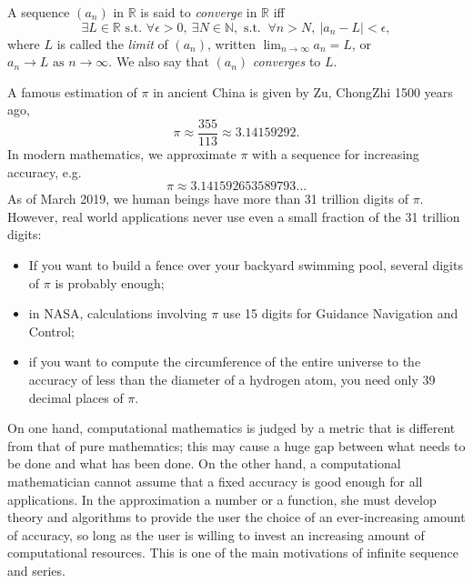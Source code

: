 \begin{defn}
  \label{def:limitOfSequence}
  A sequence $(a_n)$ in $\mathbb{R}$
  is said to \emph{converge} in $\mathbb{R}$ iff
  \begin{equation}
    \label{eq:limitOfSequence}
    \exists L\in \mathbb{R} \text{ s.t. }  
    \forall \epsilon>0,\ \exists N\in \mathbb{N}, \text{ s.t. }\ 
    \forall n>N, \ |a_n-L| < \epsilon, 
  \end{equation}
  where $L$ is called the \emph{limit} of $(a_n)$, 
  written $\lim_{n\rightarrow \infty} a_n = L$,
  or 
  \mbox{$a_n\rightarrow L \text{ as } n\rightarrow\infty$}.
  We also say that $(a_n)$ \emph{converges} to $L$.
\end{defn}

\begin{exm}[A story of $\pi$]
  A famous estimation of $\pi$ in ancient China
  is given by Zu, ChongZhi 1500 years ago,
  \begin{equation*}
    \pi\approx \frac{355}{113}\approx 3.14159292.
  \end{equation*}
  In modern mathematics,
   we approximate $\pi$ with a sequence
   for increasing accuracy, e.g. 
   \begin{equation}
     \label{eq:pi}
     \pi \approx 3.14159 26535 89793 \ldots
   \end{equation}
  As of March 2019, we human beings have more than 31 trillion digits
  of $\pi$.
  However, real world applications
  never use even a small fraction of the 31 trillion digits:
  \begin{itemize}\itemsep0em
  \item If you want to build a fence over your backyard swimming pool,
    several digits of $\pi$ is probably enough;
  \item in NASA, calculations involving $\pi$
    use 15 digits for Guidance Navigation and Control;
  \item if you want to compute the circumference of the entire universe
    to the accuracy of less than the diameter of a hydrogen atom,
    you need only 39 decimal places of $\pi$.
  \end{itemize}
  

 On one hand, computational mathematics
 is judged by a metric that is different
 from that of pure mathematics;
 this may cause a huge gap
 between what needs to be done and what has been done.
%
On the other hand,
a computational mathematician cannot assume
that a fixed accuracy is good enough
for all applications.
In the approximation a number or a function, 
 she must develop theory and algorithms
 to provide the user the choice of an ever-increasing amount of accuracy, 
 so long as the user is willing
 to invest an increasing amount of computational resources.
This is one of the main motivations of infinite sequence and series.
\end{exm}

